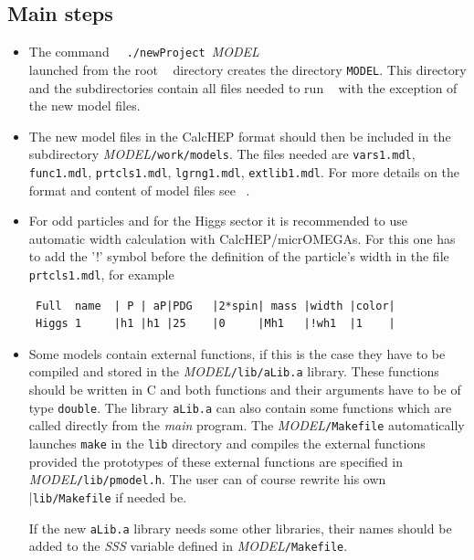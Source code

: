 \documentclass[12pt,a4paper]{article}
\begin{document}
\subsection{ Main steps}
\begin{itemize}
\item
The command
\verb|  ./newProject |{\it MODEL}\\
launched from the root \micro~ directory  creates the directory 
\verb|MODEL|. This directory and the subdirectories contain all files needed to run \micro~ with the
exception of the new model files. 
\item
The new model files in the CalcHEP format should then be included in the
 subdirectory {\it MODEL}\verb|/work/models|.  The files needed are
\verb|vars1.mdl|,  \verb|func1.mdl|,  \verb|prtcls1.mdl|, \verb|lgrng1.mdl|,
\verb|extlib1.mdl|. For more details on the format and content of model files see
~\cite{Pukhov:2004ca}.

\item
For odd particles and for the Higgs sector it is recommended to 
use automatic width calculation with CalcHEP/micrOMEGAs. 
For this  one has to add the '!' symbol before  
the definition of the particle's width  in  the file \verb|prtcls1.mdl|, for example
\begin{verbatim}
 Full  name  | P | aP|PDG   |2*spin| mass |width |color|  
 Higgs 1     |h1 |h1 |25    |0     |Mh1   |!wh1  |1    |
\end{verbatim}


\item
Some models contain  external functions, if this is the case  they have to be 
compiled and stored in the {\it MODEL}\verb|/lib/aLib.a| library. 
These functions should be written in C and both functions and their arguments have to be 
of type \verb|double|. The library \verb|aLib.a| 
can also contain some functions which are called directly from the 
{\it main} program. The {\it MODEL}\verb|/Makefile| automatically launches
\verb|make| in the \verb|lib| directory and compiles the external functions provided
the prototypes of these external 
functions are specified in  {\it MODEL}\verb|/lib/pmodel.h|. 
The user can of course rewrite 
his own  |\verb|lib/Makefile| if needed be.

If the new \verb|aLib.a| library needs some other libraries, their
names should be added to the {\it SSS} variable defined in {\it MODEL}\verb|/Makefile|.
\end{itemize}
\end{document}
